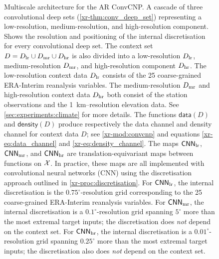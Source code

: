 \documentclass[12pt, twoside]{report}
\newcommand{\xrprefix}[1]{xr-#1}
\begin{document}
\begin{figure}[t]
    \captionsetup{font=footnotesize}
    \caption[
        Multiscale architecture for the AR ConvCNP
    ]{
        \footnotesize
        Multiscale architecture for the AR ConvCNP.
        A cascade of three convolutional deep sets (\cref{\xrprefix{thm:conv_deep_set}})
        representing a low-resolution, medium-resolution, and high-resolution component.
        Shows the resolution and positioning of the internal discretisation for every convolutional deep set.
        The context set $D = D\ss{lr} \cup D\ss{mr} \cup D\ss{hr}$ is also divided into
        a low-resolution $D\ss{lr}$, medium-resolution $D\ss{mr}$,
        and high-resolution component $D\ss{hr}$.
        The low-resolution context data $D\ss{lr}$ consists of the 25 coarse-grained ERA-Interim reanalysis variables.
        The medium-resolution $D\ss{mr}$ and high-resolution context data $D\ss{hr}$ both consist of the station observations and the \SI{1}{km}--resolution elevation data.
        See \cref{sec:experiments:climate} for more details.
        The functions $\mathsf{data}(D)$ and $\mathsf{density}(D)$ produce respectively the data channel
        and density channel for context data $D$;
        see \cref{\xrprefix{mod:convcnp}} and equations \eqref{\xrprefix{eq:data_channel}} and \eqref{\xrprefix{eq:density_channel}}.
        The maps $\mathsf{CNN}\ss{lr}$, $\mathsf{CNN}\ss{mr}$, and $\mathsf{CNN}\ss{hr}$
        are translation-equivariant maps between functions on $\mathcal{X}$.
        In practice, these maps are all implemented with convolutional neural networks (CNN)
        using the discretisation approach outlined in \cref{\xrprefix{proc:discretisation}}.
        For $\mathsf{CNN}\ss{lr}$, the internal discretisation is the $0.75^\circ$-resolution grid
        corresponding to the 25 coarse-grained ERA-Interim reanalysis variables.
        For $\mathsf{CNN}\ss{mr}$, the internal discretisation is a $0.1^\circ$-resolution grid
        spanning $5^\circ$ more than the most extremal target inputs;
        the discretisation does \emph{not} depend on the context set.
        For $\mathsf{CNN}\ss{hr}$, the internal discretisation is a $0.01^\circ$-resolution grid
        spanning $0.25^\circ$ more than the most extremal target inputs;
        the discretisation also does \emph{not} depend on the context set.
    }
    \label{fig:multires_arch}
\end{figure}
\end{document}
